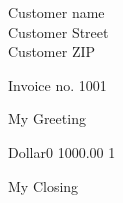 \documentclass{letter}
\begin{document}
\begin{letter}{Customer name \\ Customer Street \\ Customer ZIP}
  \opening{Invoice no. 1001}
  My Greeting
  \begin{invoice}{Dollar}{0}
     {1000.00} {1}
\end{invoice}
\closing{My Closing}
\end{letter}%
\end{document}
